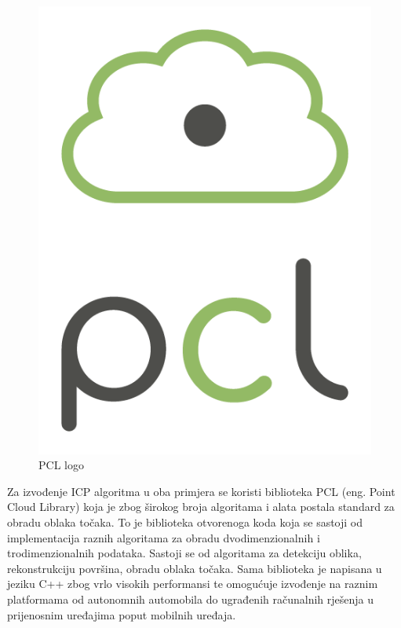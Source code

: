 \begin{figure}[ht!]
  \centering
  \includegraphics[scale=0.2]{images/pcl_logo.png}
  \caption{PCL logo\cite{logo:pcl}}
  \label{fig:pcl_logo}
\end{figure}

Za izvođenje ICP algoritma u oba primjera se koristi biblioteka PCL (eng. Point Cloud Library) koja je zbog širokog broja algoritama i alata postala standard za obradu oblaka točaka. To je biblioteka otvorenoga koda koja se sastoji od implementacija raznih algoritama za obradu dvodimenzionalnih i trodimenzionalnih podataka. Sastoji se od algoritama za detekciju oblika, rekonstrukciju površina, obradu oblaka točaka. Sama biblioteka je napisana u jeziku C++ zbog vrlo visokih performansi te omogućuje izvođenje na raznim platformama od autonomnih automobila do ugrađenih računalnih rješenja u prijenosnim uređajima poput mobilnih uređaja.
\pagebreak